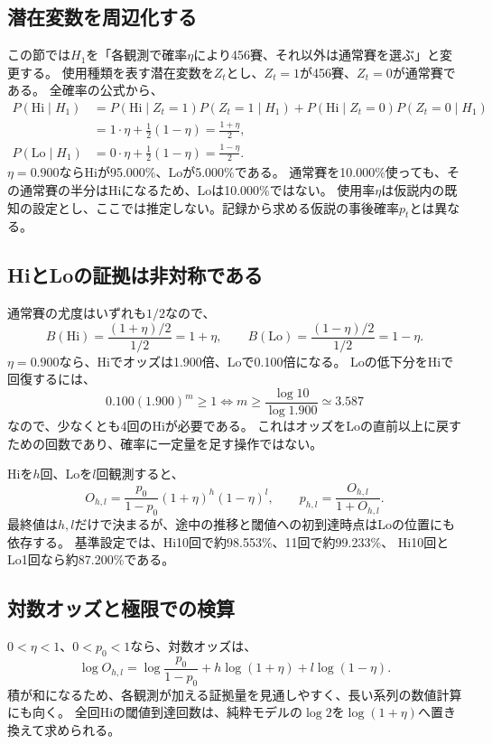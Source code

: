 \documentclass[11pt,a4paper]{article}
\numberwithin{equation}{section}
\newcommand{\HH}{\mathrm{Hi}}
\newcommand{\LL}{\mathrm{Lo}}
\begin{document}
\subsection{潜在変数を周辺化する}
この節では$H_1$を「各観測で確率$\eta$により456賽、それ以外は通常賽を選ぶ」と変更する。
使用種類を表す潜在変数を$Z_t$とし、$Z_t=1$が456賽、$Z_t=0$が通常賽である。
全確率の公式から、
\begin{align}
P(\HH\mid H_1)
&=P(\HH\mid Z_t=1)P(Z_t=1\mid H_1)
 +P(\HH\mid Z_t=0)P(Z_t=0\mid H_1)\\
&=1\cdot\eta+\frac12(1-\eta)=\frac{1+\eta}{2},\\
P(\LL\mid H_1)
&=0\cdot\eta+\frac12(1-\eta)=\frac{1-\eta}{2}.
\end{align}
$\eta=0.900$ならHiが95.000\%、Loが5.000\%である。
通常賽を10.000\%使っても、その通常賽の半分はHiになるため、Loは10.000\%ではない。
使用率$\eta$は仮説内の既知の設定とし、ここでは推定しない。記録から求める仮説の事後確率$p_t$とは異なる。

\subsection{HiとLoの証拠は非対称である}
通常賽の尤度はいずれも$1/2$なので、
\begin{equation}
B(\HH)=\frac{(1+\eta)/2}{1/2}=1+\eta,\qquad
B(\LL)=\frac{(1-\eta)/2}{1/2}=1-\eta.
\end{equation}
$\eta=0.900$なら、Hiでオッズは1.900倍、Loで0.100倍になる。
Loの低下分をHiで回復するには、
\[
0.100(1.900)^m\ge1
\iff m\ge\frac{\log10}{\log1.900}\simeq3.587
\]
なので、少なくとも4回のHiが必要である。
これはオッズをLoの直前以上に戻すための回数であり、確率に一定量を足す操作ではない。

Hiを$h$回、Loを$l$回観測すると、
\begin{equation}
O_{h,l}=\frac{p_0}{1-p_0}(1+\eta)^h(1-\eta)^l,\qquad
p_{h,l}=\frac{O_{h,l}}{1+O_{h,l}}.
\label{eq:mixedodds}
\end{equation}
最終値は$h,l$だけで決まるが、途中の推移と閾値への初到達時点はLoの位置にも依存する。
基準設定では、Hi10回で約98.553\%、11回で約99.233\%、
Hi10回とLo1回なら約87.200\%である。

\subsection{対数オッズと極限での検算}
$0<\eta<1$、$0<p_0<1$なら、対数オッズは、
\begin{equation}
\log O_{h,l}
=\log\frac{p_0}{1-p_0}
 +h\log(1+\eta)+l\log(1-\eta).
\end{equation}
積が和になるため、各観測が加える証拠量を見通しやすく、長い系列の数値計算にも向く。
全回Hiの閾値到達回数は、純粋モデルの$\log2$を$\log(1+\eta)$へ置き換えて求められる。
\end{document}
